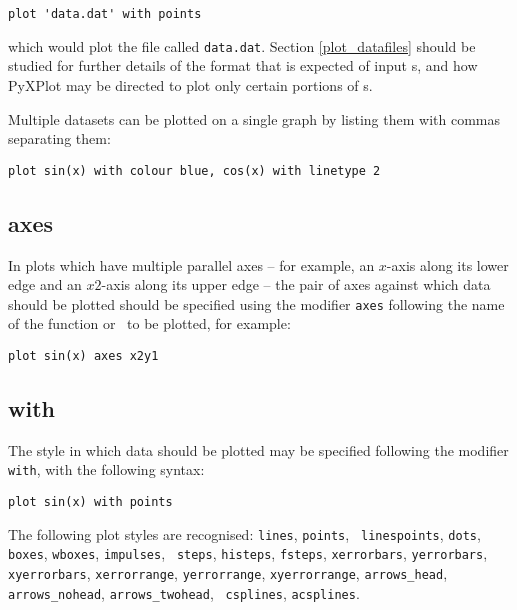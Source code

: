 \begin{verbatim}
plot 'data.dat' with points
\end{verbatim}

\noindent which would plot the file called {\tt data.dat}.  Section
\ref{plot_datafiles} should be studied for further details of the format that is
expected of input \datafile s, and how PyXPlot may be directed to plot only
certain portions of \datafile s.

Multiple datasets can be plotted on a single graph by listing them with commas
separating them:

\begin{verbatim}
plot sin(x) with colour blue, cos(x) with linetype 2
\end{verbatim}

\subsection{axes}

In plots which have multiple parallel axes -- for example, an $x$-axis along its
lower edge and an $x2$-axis along its upper edge -- the pair of axes against
which data should be plotted should be specified using the modifier {\tt axes}
following the name of the function or \datafile\ to be plotted, for example:

\begin{verbatim}
plot sin(x) axes x2y1
\end{verbatim}

\subsection{with}

The style in which data should be plotted may be specified following the
modifier {\tt with}, with the following syntax:

\begin{verbatim}
plot sin(x) with points
\end{verbatim}

\label{list_of_plotstyles}
The following plot styles are recognised: {\tt lines}, {\tt points}, {\tt
linespoints}, {\tt dots}, {\tt boxes}, {\tt wboxes}, {\tt impulses}, {\tt
steps}, {\tt histeps}, {\tt fsteps}, {\tt xerrorbars}, {\tt yerrorbars}, {\tt
xyerrorbars}, {\tt xerrorrange}, {\tt yerrorrange}, {\tt xyerrorrange},
\newline\noindent %
{\tt arrows\_head}, {\tt arrows\_nohead}, {\tt arrows\_twohead}, {\tt
csplines}, {\tt acsplines}.


